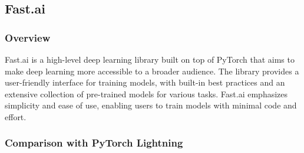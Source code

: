 \documentclass[12pt]{article}
\begin{document}
\subsection{Fast.ai}

\subsubsection{Overview}

Fast.ai is a high-level deep learning library built on top of PyTorch that aims to make deep learning more accessible to a broader audience. The library provides a user-friendly interface for training models, with built-in best practices and an extensive collection of pre-trained models for various tasks. Fast.ai emphasizes simplicity and ease of use, enabling users to train models with minimal code and effort.

\subsubsection{Comparison with PyTorch Lightning}
\end{document}
